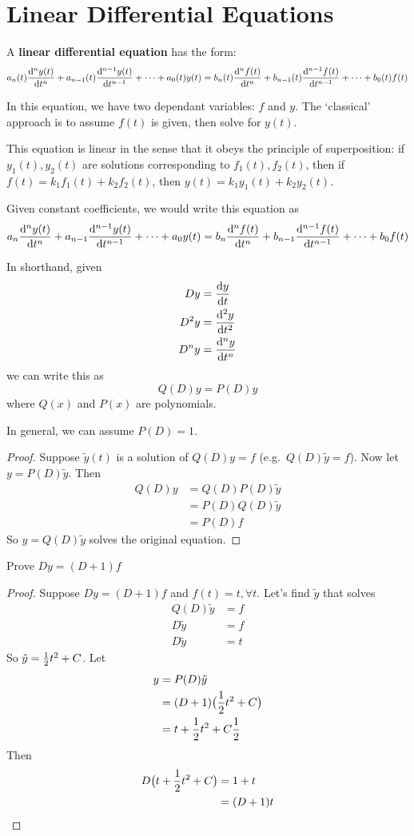\documentclass[12pt]{article}
\begin{document}
\section{Linear Differential Equations}
A {\bf linear differential equation} has the form: \[ a_n(t)\frac{{\rm d}^{n} y(t)}{{\rm d} t^{n}} + a_{n-1}(t)\frac{{\rm d}^{n-1} y(t)}{{\rm d} t^{n-1}} + \cdots + a_0(t) y(t) = b_n(t)\frac{{\rm d}^{n} f(t)}{{\rm d} t^{n}} + b_{n-1}(t)\frac{{\rm d}^{n-1} f(t)}{{\rm d} t^{n-1}} + \cdots + b_0(t) f(t) \]

In this equation, we have two dependant variables: $f$ and $y$. The `classical' approach is to assume $f(t)$ is given, then solve for $y(t)$.

This equation is linear in the sense that it obeys the principle of superposition: if $y_1(t), y_2(t)$ are solutions corresponding to $f_1(t), f_2(t)$, then if $f(t) = k_1f_1(t) + k_2f_2(t)$, then $y(t) = k_1y_1(t) + k_2y_2(t)$.

Given constant coefficients, we would write this equation as \[ a_n\frac{{\rm d}^{n} y(t)}{{\rm d} t^{n}} + a_{n-1}\frac{{\rm d}^{n-1} y(t)}{{\rm d} t^{n-1}} + \cdots + a_0y(t) = b_n\frac{{\rm d}^{n} f(t)}{{\rm d} t^{n}} + b_{n-1}\frac{{\rm d}^{n-1} f(t)}{{\rm d} t^{n-1}} + \cdots + b_0f(t) \]

In shorthand, given
\begin{align*}
Dy &= \frac{{\rm d} y}{{\rm d} t}\\
D^2 y &= \frac{{\rm d}^2 y}{{\rm d} t^2}\\
D^n y &= \frac{{\rm d}^{n} y}{{\rm d} t^{n}}
\end{align*}
we can write this as \[ Q(D)y = P(D)y \] where $Q(x)$ and $P(x)$ are polynomials.

In general, we can assume $P(D) = 1$.

\begin{proof}
Suppose $\tilde y(t)$ is a solution of $Q(D)y = f$ (e.g.\ $Q(D) \tilde y = f$). Now let $y = P(D) \tilde y$. Then
\begin{align*}
Q(D)y &= Q(D)P(D) \tilde y\\
&= P(D)Q(D)\tilde y\\
&= P(D) f
\end{align*}
So $y = Q(D)\tilde y$ solves the original equation.
\end{proof}

\begin{example}
Prove $Dy = (D+1)f$
\end{example}

\begin{proof}
Suppose $Dy = (D + 1)f$ and $f(t) = t, \forall t$. Let's find $\tilde y$ that solves
\begin{align*}
Q(D)\tilde y &= f\\
D\tilde y &= f\\
D\tilde y &= t
\end{align*}
So $\tilde y = \frac{1}{2} t^2 + C$. Let
\begin{align*}
y &= P(D)\tilde y\\
&= (D+1)\bigl(\frac{1}{2} t^2 + C\bigl)\\
&= t + \frac{1}{2} t^2 + C \frac{1}{2}
\end{align*}
Then
\begin{align*}
D\bigl(t + \frac{1}{2} t^2 + C\bigl) &= 1 + t\\
&= (D + 1)t
\end{align*}
\end{proof}
\end{document}
